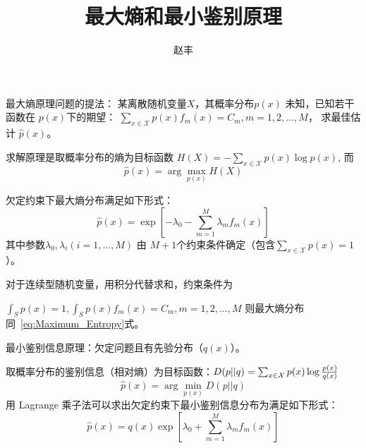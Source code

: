 \documentclass{article}
\author{赵丰}
\title{最大熵和最小鉴别原理}
\def\X{\mathcal{X}}
\begin{document}
\maketitle
最大熵原理问题的提法：
某离散随机变量$X$，其概率分布$p(x)$ 未知，已知若干函数在 $p(x)$下的期望：
$ \sum_{x \in \X} p(x) f_m(x) = C_m, m =1, 2, \dots, M$， 求最佳估计 $\hat{p}(x)$。

求解原理是取概率分布的熵为目标函数
$ H(X) = - \sum_{x \in \X} p(x) \log p(x)$, 而
\begin{equation}
\hat{p}(x) = \arg\max_{p(x)} H(X)
\end{equation}

欠定约束下最大熵分布满足如下形式：
\begin{equation}\label{eq:Maximum_Entropy}
\hat{p}(x) = \exp\left[ - \lambda_0 - \sum_{ m = 1 }^M \lambda_m f_m(x) \right]
\end{equation}
其中参数$\lambda_0, \lambda_i (i=1, \dots, M)$ 由 $M+1 $个约束条件确定（包含$\sum_{x \in \X} p(x) = 1$）。

对于连续型随机变量，用积分代替求和，约束条件为

$ \int_S p(x)=1, \int_S p(x) f_m(x) = C_m, m = 1, 2, \dots, M$
则最大熵分布同~\eqref{eq:Maximum_Entropy}式。

最小鉴别信息原理：欠定问题且有先验分布（$q(x)$）。

取概率分布的鉴别信息（相对熵）为目标函数：$D(p || q) = \sum_{x \in \X} p(x) \log { p(x) \over q(x) } $
\begin{equation}
\hat{p}(x) = \arg \min_{p(x)} D( p || q)
\end{equation}
用 Lagrange 乘子法可以求出欠定约束下最小鉴别信息分布为满足如下形式：
\begin{equation}\label{eq:Principle_of_Minimum_Discrimination_Information}
\hat{p}(x) = q(x)\exp\left[ \lambda_0 + \sum_{ m = 1 }^M \lambda_m f_m(x) \right]
\end{equation}
\end{document}
